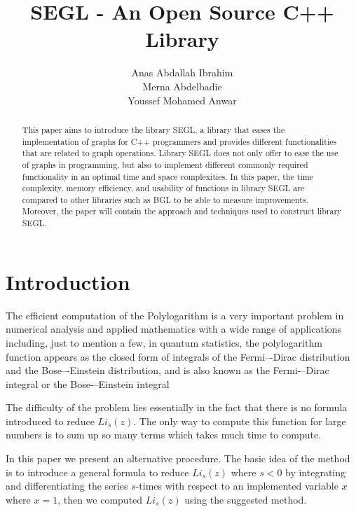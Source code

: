 \documentclass{amsart}
\begin{document}
 
\title{SEGL - An Open Source C++ Library}
\let\MakeUppercase\relax %

\author{Anas Abdallah Ibrahim\\Merna Abdelbadie\\Youssef Mohamed Anwar}
\address{\normalfont Undergraduate Students at the American University in Cairo}


\begin{abstract}
This paper aims to introduce the library SEGL, a library that eases the implementation of graphs for C++ programmers and provides different functionalities that are related to graph operations. Library SEGL does not only offer to ease the use of graphs in programming, but also to implement different commonly required functionality in an optimal time and space complexities. In this paper, the time complexity, memory efficiency, and usability of functions in library SEGL are compared to other libraries such as BGL to be able to measure improvements. Moreover, the paper will contain the approach and techniques used to construct library SEGL.
\end{abstract}

\maketitle

\section{Introduction}
\label{se:introduction}

The efficient computation of the Polylogarithm 
is a very important problem in numerical analysis and applied mathematics
with a wide range of applications including, just to mention a few,
in quantum statistics, the polylogarithm function appears as the closed form of integrals of the Fermi–-Dirac distribution and the Bose–-Einstein distribution, and is also known as the Fermi-–Dirac integral or the Bose-–Einstein integral\cite{DLMF} 

The difficulty of the problem lies essentially
in the fact that there is no formula introduced to reduce $Li_{s}(z)$. The only way to compute this function for large numbers is to sum up so many terms which takes much time to compute.

In this paper we present an alternative procedure.
The basic idea of the method is to introduce a general formula to reduce $Li_{s}(z)$ where $s<0$ by integrating and differentiating the series $s$-times with respect to an implemented variable $x$ where $x=1$, then we computed $Li_{s}(z)$ using the suggested method.
\end{document}
